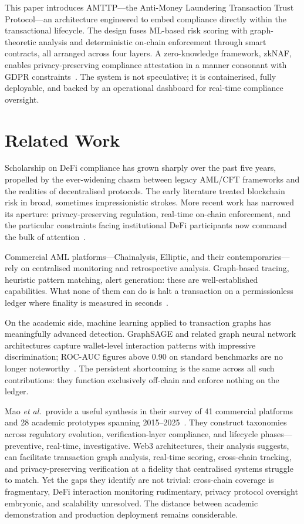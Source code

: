 \documentclass[journal]{IEEEtran}
\newcommand{\etal}{\textit{et al.}}
\begin{document}
This paper introduces AMTTP---the Anti-Money Laundering Transaction Trust Protocol---an architecture engineered to embed compliance directly within the transactional lifecycle. The design fuses ML-based risk scoring with graph-theoretic analysis and deterministic on-chain enforcement through smart contracts, all arranged across four layers. A zero-knowledge framework, zkNAF, enables privacy-preserving compliance attestation in a manner consonant with GDPR constraints~\cite{groth2016}. The system is not speculative; it is containerised, fully deployable, and backed by an operational dashboard for real-time compliance oversight.

\section{Related Work}

Scholarship on DeFi compliance has grown sharply over the past five years, propelled by the ever-widening chasm between legacy AML/CFT frameworks and the realities of decentralised protocols. The early literature treated blockchain risk in broad, sometimes impressionistic strokes. More recent work has narrowed its aperture: privacy-preserving regulation, real-time on-chain enforcement, and the particular constraints facing institutional DeFi participants now command the bulk of attention~\cite{joseph2025}.

Commercial AML platforms---Chainalysis, Elliptic, and their contemporaries---rely on centralised monitoring and retrospective analysis. Graph-based tracing, heuristic pattern matching, alert generation: these are well-established capabilities. What none of them can do is halt a transaction on a permissionless ledger where finality is measured in seconds~\cite{memgraph2024}.

On the academic side, machine learning applied to transaction graphs has meaningfully advanced detection. GraphSAGE and related graph neural network architectures capture wallet-level interaction patterns with impressive discrimination; ROC-AUC figures above 0.90 on standard benchmarks are no longer noteworthy~\cite{hamilton2017}. The persistent shortcoming is the same across all such contributions: they function exclusively off-chain and enforce nothing on the ledger.

Mao \etal\ provide a useful synthesis in their survey of 41 commercial platforms and 28 academic prototypes spanning 2015--2025~\cite{mao2025}. They construct taxonomies across regulatory evolution, verification-layer compliance, and lifecycle phases---preventive, real-time, investigative. Web3 architectures, their analysis suggests, can facilitate transaction graph analysis, real-time scoring, cross-chain tracking, and privacy-preserving verification at a fidelity that centralised systems struggle to match. Yet the gaps they identify are not trivial: cross-chain coverage is fragmentary, DeFi interaction monitoring rudimentary, privacy protocol oversight embryonic, and scalability unresolved. The distance between academic demonstration and production deployment remains considerable.
\end{document}
